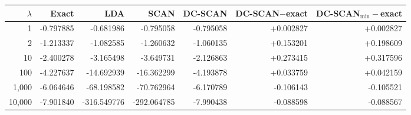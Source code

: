 \begin{tabular}{@{}rrrrrrr@{}}
\toprule
$\lambda$ & Exact & LDA & SCAN & DC-SCAN & DC-SCAN$-$exact & DC-SCAN$_{\min}-$exact \\
\midrule
1 & -0.797885 & -0.681986 & -0.795058 & -0.795058 & +0.002827 & +0.002827 \\
2 & -1.213337 & -1.082585 & -1.260632 & -1.060135 & +0.153201 & +0.198609 \\
10 & -2.400278 & -3.165498 & -3.649731 & -2.126863 & +0.273415 & +0.317596 \\
100 & -4.227637 & -14.692939 & -16.362299 & -4.193878 & +0.033759 & +0.042159 \\
1,000 & -6.064646 & -68.198582 & -70.762964 & -6.170789 & -0.106143 & -0.105521 \\
10,000 & -7.901840 & -316.549776 & -292.064785 & -7.990438 & -0.088598 & -0.088567 \\
\bottomrule
\end{tabular}
